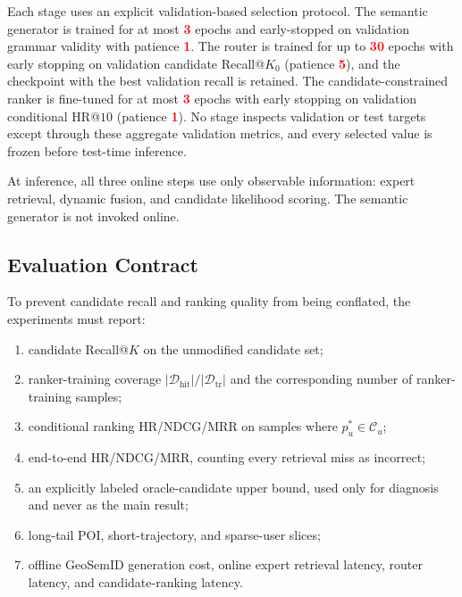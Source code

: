 \documentclass[journal]{IEEEtran}
\newcommand{\mock}[1]{\textbf{\textcolor{red}{#1}}}
\begin{document}
Each stage uses an explicit validation-based selection protocol. The semantic
generator is trained for at most \mock{3} epochs and early-stopped on
validation grammar validity with patience \mock{1}. The router is trained for
up to \mock{30} epochs with early stopping on validation candidate
Recall@$K_0$ (patience \mock{5}), and the checkpoint with the best validation
recall is retained. The candidate-constrained ranker is fine-tuned for at most
\mock{3} epochs with early stopping on validation conditional HR@$10$
(patience \mock{1}). No stage inspects validation or test targets except
through these aggregate validation metrics, and every selected value is frozen
before test-time inference.

At inference, all three online steps use only observable information:
expert retrieval, dynamic fusion, and candidate likelihood scoring.
The semantic generator is not invoked online.

\subsection{Evaluation Contract}
\label{subsec:evaluation_contract}

To prevent candidate recall and ranking quality from being conflated, the
experiments must report:
\begin{enumerate}[leftmargin=*,nosep]
\item candidate Recall@$K$ on the unmodified candidate set;
\item ranker-training coverage
$|\mathcal{D}_{\mathrm{hit}}|/|\mathcal{D}_{\mathrm{tr}}|$ and the corresponding
number of ranker-training samples;
\item conditional ranking HR/NDCG/MRR on samples where
$p_u^{*}\in\mathcal{C}_u$;
\item end-to-end HR/NDCG/MRR, counting every retrieval miss as incorrect;
\item an explicitly labeled oracle-candidate upper bound, used only for
diagnosis and never as the main result;
\item long-tail POI, short-trajectory, and sparse-user slices;
\item offline GeoSemID generation cost, online expert retrieval latency,
router latency, and candidate-ranking latency.
\end{enumerate}
\end{document}
